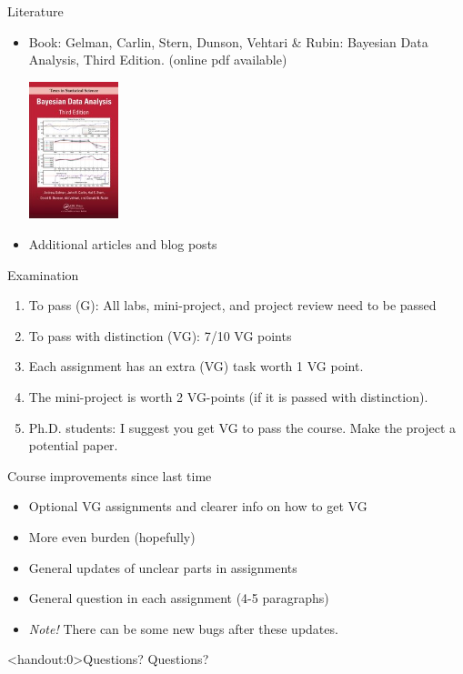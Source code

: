 \documentclass[10pt,handout]{beamer}
\begin{document}
\begin{frame}{Literature}

\begin{itemize}
  \item Book: Gelman, Carlin, Stern, Dunson, Vehtari \& Rubin: Bayesian Data Analysis, Third Edition. {\footnotesize (online pdf available)}
  \begin{center}
    \includegraphics[width=2.6cm]{figs/BDA3.jpg}
  \end{center}
  \item Additional articles and blog posts
\end{itemize}

\end{frame}

\begin{frame}{Examination}

\begin{enumerate}
\item To pass (G): All labs, mini-project, and project review need to be passed\pause
\item To pass with distinction (VG): 7/10 VG points\pause
\item Each assignment has an extra (VG) task worth 1 VG point.\pause
\item The mini-project is worth 2 VG-points (if it is passed with distinction).
\item Ph.D. students: I suggest you get VG to pass the course. Make the project a potential paper.
\end{enumerate}

\end{frame}


\begin{frame}{Course improvements since last time}

\begin{itemize}
\item Optional VG assignments and clearer info on how to get VG
\item More even burden (hopefully)
\item General updates of unclear parts in assignments
\item General question in each assignment (4-5 paragraphs)
\item \emph{Note!} There can be some new bugs after these updates.
\end{itemize}

\end{frame}

\begin{frame}<handout:0>{Questions?}
Questions?
\end{frame}

\end{document}
